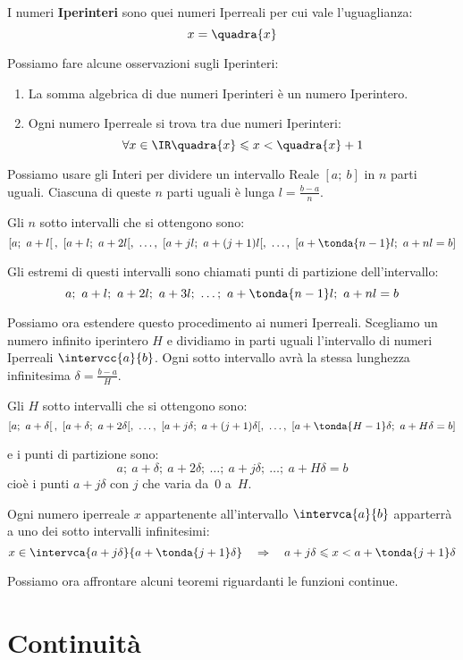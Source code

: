 \begin{definizione}
 I numeri \textbf{Iperinteri} sono quei numeri Iperreali per cui vale 
l'uguaglianza:
 \[x=\quadra{x}\]
\end{definizione}

Possiamo fare alcune osservazioni sugli Iperinteri:

\begin{enumerate}
 \item 
La somma algebrica di due numeri Iperinteri è un numero Iperintero.
 \item 
Ogni numero Iperreale si trova tra due numeri Iperinteri:
\[\forall x \in \IR \quadra{x} \leqslant x < \quadra{x}+1\]
\end{enumerate}

Possiamo usare gli Interi per dividere un intervallo Reale \([a;~b]\)
in \(n\) parti uguali. Ciascuna di queste \(n\) parti 
uguali è lunga \(l=\frac{b-a}{n}\).

Gli \(n\) sotto intervalli che si ottengono sono:
\[\left[a;~a+l \right[,~[a+l;~a+2l[,~\dots,~
[a+jl;~a+(j+1)l[,~\dots,~
[a+\tonda{n-1}l;~a+nl=b]\]

Gli estremi di questi intervalli sono chiamati punti di partizione 
dell'intervallo:
\[a;~a+l;~a+2l;~a+3l;~\dots;~a+\tonda{n-1}l;~a+nl=b\]

Possiamo ora estendere questo procedimento ai numeri Iperreali.
Scegliamo un numero infinito iperintero \(H\) e dividiamo in parti 
uguali l'intervallo di numeri Iperreali \(\intervcc{a}{b}\). Ogni 
sotto intervallo avrà la stessa lunghezza infinitesima 
\(\delta=\frac{b-a}{H}\).

Gli \(H\) sotto intervalli che si ottengono sono:
\[\left[a;~a+\delta \right[,~[a+\delta;~a+2\delta[,~\dots,~
[a+j\delta;~a+(j+1)\delta[,~\dots,~
[a+\tonda{H-1}\delta;~a+H\delta=b]\]

e i punti di partizione sono:
\[a;~a+\delta;~a+2\delta;~\dots;~a+j\delta;~\dots;~a+H\delta=b\]
cioè i punti \(a+j\delta\) con \(j\) che varia da~0 a~\(H\).

Ogni numero iperreale \(x\) appartenente all'intervallo \(\intervca{a}{b}\)
apparterrà a uno dei sotto intervalli infinitesimi:
\[x \in \intervca{a+j\delta}{a+\tonda{j+1}\delta} \quad \Rightarrow \quad 
  a+j\delta \leqslant x < a+\tonda{j+1}\delta\]

Possiamo ora affrontare alcuni teoremi riguardanti le funzioni continue.

\section{Continuità}
\label{sec:cont_continuita}

